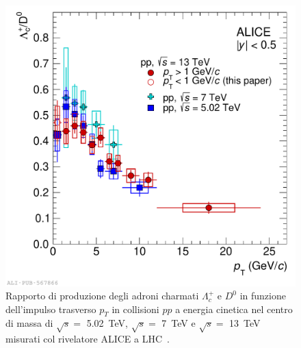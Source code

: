         \begin{figure}[h]
            \centering
            \includegraphics[width=0.83\linewidth]{res/fig/1-chapter/9-ALICE-pp5.02TeV-pp7TeV-pp13TeV.pdf}
            \caption{Rapporto di produzione degli adroni charmati $\Lambda_{c}^{+}$ e $D^{0}$ in funzione dell'impulso trasverso $p_{T}$ in collisioni $pp$ a energia cinetica nel centro di massa di $\sqrt{s} =$ \qty{5.02}{\tera \eV}, $\sqrt{s} =$ \qty{7}{\tera \eV} e $\sqrt{s} =$ \qty{13}{\tera \eV} misurati col rivelatore ALICE a LHC~\cite{ALICE_2023_pp5.02TeV_pp7TeV_pp13TeV}.}
            \label{fig:9-ALICE-pp5.02TeV-pp7TeV-pp13TeV}
        \end{figure}

